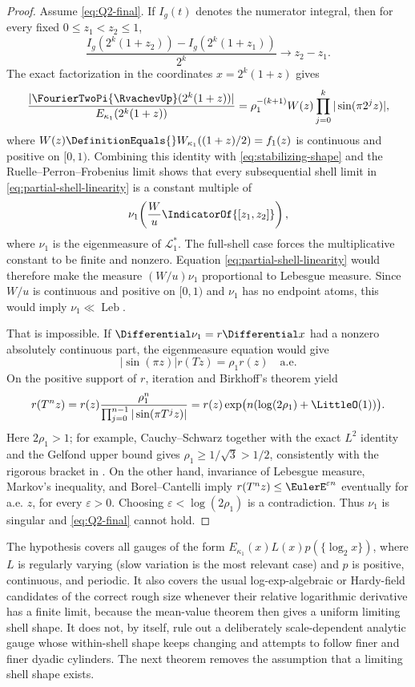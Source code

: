 \documentclass[11pt,oneside]{article}
\numberwithin{equation}{section}
\theoremstyle{definition}
\theoremstyle{remark}
\newcommand{\CesaroNumerator}{I_g}
\newcommand{\LebesgueMeasure}{\operatorname{Leb}}
\begin{document}
\begin{proof}
Assume \eqref{eq:Q2-final}.  If $\CesaroNumerator(t)$ denotes the numerator integral,
then for every fixed
$0\le z_1<z_2\le1$,
\begin{equation}
 \frac{\CesaroNumerator(2^k(1+z_2))-\CesaroNumerator(2^k(1+z_1))}{2^k}
 \longrightarrow z_2-z_1.
 \label{eq:partial-shell-linearity}
\end{equation}
The exact factorization in the coordinates $x=2^k(1+z)$ gives
\[
 \frac{|\FourierTwoPi{\RvachevUp}(2^k(1+z))|}{E_{\kappa_1}(2^k(1+z))}
 =\rho_1^{-(k+1)}W(z)\prod_{j=0}^{k}|\sin(\pi2^jz)|,
\]
where
$W(z)\DefinitionEquals{}W_{\kappa_1}((1+z)/2)=f_1(z)$ is continuous and positive on $[0,1)$.
Combining this identity with
\eqref{eq:stabilizing-shape} and the Ruelle--Perron--Frobenius limit shows that every
subsequential shell limit in \eqref{eq:partial-shell-linearity} is a constant multiple of
\[
 \nu_1\!\left(\frac{W}{u}\IndicatorOf{[z_1,z_2]}\right),
\]
where $\nu_1$ is the eigenmeasure of $\mathcal L_1^*$.  The full-shell case forces the
multiplicative constant to be finite and nonzero.  Equation
\eqref{eq:partial-shell-linearity} would therefore make the measure
$(W/u)\nu_1$ proportional to Lebesgue measure.  Since $W/u$ is continuous and positive on
$[0,1)$ and $\nu_1$ has no endpoint atoms, this would imply $\nu_1\ll\LebesgueMeasure$.

That is impossible.  If $\Differential\nu_1=r\Differential x$ had a nonzero absolutely continuous part, the
eigenmeasure equation would give
\begin{equation}
 |\sin(\pi z)|r(Tz)=\rho_1r(z)
 \quad\text{a.e.}
 \label{eq:conformal-density-final}
\end{equation}
On the positive support of $r$, iteration and Birkhoff's theorem yield
\[
 r(T^nz)=r(z)\frac{\rho_1^n}
 {\prod_{j=0}^{n-1}|\sin(\pi T^jz)|}
 =r(z)\exp\bigl(n(\log(2\rho_1)+\LittleO(1))\bigr).
\]
Here $2\rho_1>1$; for example, Cauchy--Schwarz together with the exact $L^2$ identity and
the Gelfond upper bound gives $\rho_1\ge1/\sqrt3>1/2$, consistently with the rigorous
bracket in .  On the other hand, invariance of
Lebesgue measure, Markov's inequality, and Borel--Cantelli imply
$r(T^nz)\le\EulerE^{\varepsilon n}$ eventually for a.e. $z$, for every $\varepsilon>0$.
Choosing $\varepsilon<\log(2\rho_1)$ is a contradiction.  Thus $\nu_1$ is singular and
\eqref{eq:Q2-final} cannot hold.
\end{proof}

The hypothesis covers all gauges of the form
$E_{\kappa_1}(x)L(x)p(\{\log_2x\})$, where $L$ is regularly varying (slow variation is the
most relevant case) and $p$ is positive, continuous, and periodic.  It also covers the
usual log-exp-algebraic or Hardy-field candidates of the correct rough size whenever their
relative logarithmic derivative has a finite limit, because the mean-value theorem then
gives a uniform limiting shell shape.  It does not, by itself, rule out a deliberately
scale-dependent analytic gauge whose within-shell shape keeps changing and attempts to
follow finer and finer dyadic cylinders.  The next theorem removes the assumption that a
limiting shell shape exists.
\end{document}
